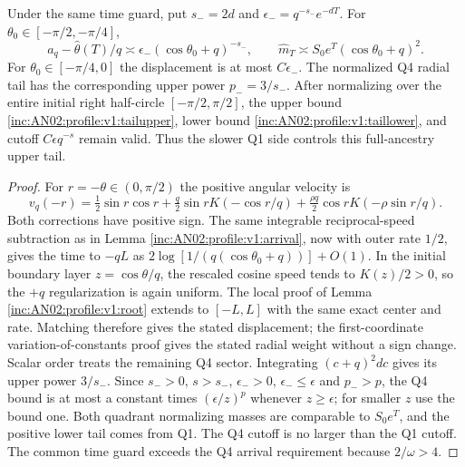 \documentclass[11pt]{article}
\numberwithin{equation}{section}
\theoremstyle{remark}\newtheorem{remark}[theorem]{Remark}
\begin{document}
\begin{corollary}\label{inc:AN02:profile:v1:rightcircle}
Under the same time guard, put $s_-=2d$ and $\epsilon_-=q^{-s_-}e^{-dT}$. For $\theta_0\in[-\pi/2,-\pi/4]$,
\[
 a_q-\widehat\theta(T)/q\asymp\epsilon_-(\cos\theta_0+q)^{-s_-},\qquad
 \widehat m_T\asymp S_0e^T(\cos\theta_0+q)^2.
\]
For $\theta_0\in[-\pi/4,0]$ the displacement is at most $C\epsilon_-$. The normalized Q4 radial tail has the corresponding upper power $p_-=3/s_-$. After normalizing over the entire initial right half-circle $[-\pi/2,\pi/2]$, the upper bound \eqref{inc:AN02:profile:v1:tailupper}, lower bound \eqref{inc:AN02:profile:v1:taillower}, and cutoff $C\epsilon q^{-s}$ remain valid. Thus the slower Q1 side controls this full-ancestry upper tail.
\end{corollary}
\begin{proof}
For $r=-\theta\in(0,\pi/2)$ the positive angular velocity is
\[
 v_q(-r)=\tfrac12\sin r\cos r
 +\tfrac q2\sin r K(-\cos r/q)
 +\tfrac{\rho q}{2}\cos r K(-\rho\sin r/q).
\]
Both corrections have positive sign. The same integrable reciprocal-speed subtraction as in Lemma \ref{inc:AN02:profile:v1:arrival}, now with outer rate $1/2$, gives the time to $-qL$ as
$2\log[1/(q(\cos\theta_0+q))]+O(1)$. In the initial boundary layer $z=\cos\theta/q$, the rescaled cosine speed tends to $K(z)/2>0$, so the $+q$ regularization is again uniform. The local proof of Lemma \ref{inc:AN02:profile:v1:root} extends to $[-L,L]$ with the same exact center and rate. Matching therefore gives the stated displacement; the first-coordinate variation-of-constants proof gives the stated radial weight without a sign change. Scalar order treats the remaining Q4 sector. Integrating $(c+q)^2dc$ gives its upper power $3/s_-$.
Since $s_->0$, $s>s_-$, $\epsilon_->0$, $\epsilon_-\le\epsilon$ and $p_->p$, the Q4 bound is at most a constant times $(\epsilon/z)^p$ whenever $z\ge\epsilon$; for smaller $z$ use the bound one. Both quadrant normalizing masses are comparable to $S_0e^T$, and the positive lower tail comes from Q1. The Q4 cutoff is no larger than the Q1 cutoff. The common time guard exceeds the Q4 arrival requirement because $2/\omega>4$.
\end{proof}
\end{document}
